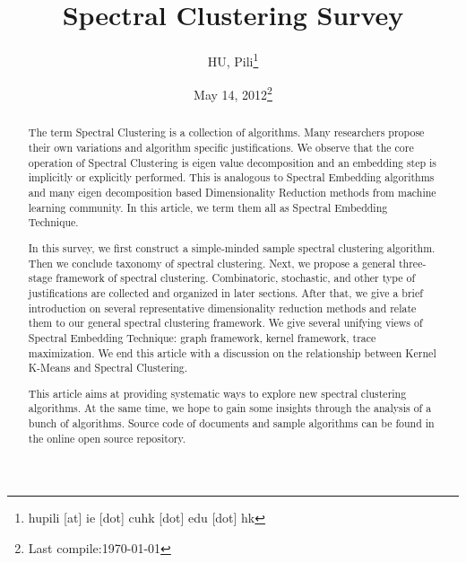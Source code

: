 

\usepackage{algorithm}
\usepackage{algorithmic}
\renewcommand{\algorithmicrequire}{\textbf{Input:}}
\renewcommand{\algorithmicensure}{\textbf{Output:}}

\newcommand{\nL}{\mathcal{L}}
\newcommand{\nA}{\mathcal{A}}
\newcommand{\sym}[1]{#1_{\text{sym}}}
\newcommand{\rw}[1]{#1_{\text{rw}}}
\newcommand{\cut}[1]{\text{cut}(#1)}
\newcommand{\assoc}[1]{\text{assoc}(#1)}
\newcommand{\vol}[1]{\text{vol}(#1)}
\newcommand{\mpinv}{+}


\usepackage{subfigure}


\author{HU, Pili\thanks{hupili [at] ie [dot] cuhk [dot] edu [dot] hk}}

\title{Spectral Clustering Survey}
\date{May 14, 2012\thanks{Last compile:\today}}



\maketitle
\begin{abstract}
	The term Spectral Clustering is a collection of algorithms. 
	Many researchers propose their own variations and 
	algorithm specific justifications. We observe that 
	the core operation of Spectral Clustering is eigen value 
	decomposition and an embedding step is implicitly or 
	explicitly performed. This is analogous to Spectral Embedding
	algorithms and many eigen decomposition based Dimensionality 
	Reduction methods from machine learning community. In 
	this article, we term them all as Spectral Embedding 
	Technique. 
	
	In this survey, we first construct a simple-minded 
	sample spectral clustering algorithm. 
	Then we conclude taxonomy of spectral clustering.
	Next, we propose 
	a general three-stage framework of spectral clustering.  
	Combinatoric, stochastic, and other type of justifications
	are collected and organized in later sections. 
	After that, we give a brief introduction on 
	several representative dimensionality 
	reduction methods and relate them to our general 
	spectral clustering framework. 
	We give several unifying views of Spectral Embedding 
	Technique: graph framework, kernel framework, 
	trace maximization. We end this article with 
	a discussion on the relationship between 
	Kernel K-Means and Spectral Clustering. 
	
	This article aims at providing systematic ways 
	to explore new spectral clustering algorithms.
	At the same time, we hope to gain some insights 
	through the analysis of a bunch of algorithms.  
	Source code of documents and sample algorithms can be found 
	in the online open source repository\cite{hu2012-spectral2hop}. 
\end{abstract}

